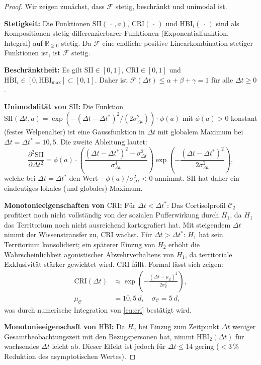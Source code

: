 ﻿\documentclass[12pt, a4paper]{article}
\theoremstyle{plain}
\theoremstyle{definition}
\theoremstyle{remark}
\newcommand{\HBI}{\mathrm{HBI}}
\newcommand{\SII}{\mathrm{SII}}
\newcommand{\CRI}{\mathrm{CRI}}
\newcommand{\R}{\mathbb{R}}
\newcommand{\dt}{\Delta t}
\newcommand{\cort}{\mathcal{C}}
\begin{document}
\begin{proof}
Wir zeigen zunächst, dass $\mathcal{F}$ stetig, beschränkt und unimodal ist.

\textbf{Stetigkeit:} Die Funktionen $\SII(\,\cdot\,, a)$, $\CRI(\,\cdot\,)$
und $\overline{\HBI}_i(\,\cdot\,)$ sind als Kompositionen stetig differenzierbarer
Funktionen (Exponentialfunktion, Integral) auf $\R_{\geq 0}$ stetig. Da
$\mathcal{F}$ eine endliche positive Linearkombination stetiger Funktionen ist,
ist $\mathcal{F}$ stetig.

\textbf{Beschränktheit:} Es gilt $\SII \in [0,1]$, $\CRI \in [0,1]$ und
$\overline{\HBI}_i \in [0, \HBI_{\mathrm{max}}] \subset [0,1]$. Daher ist
$\mathcal{F}(\dt) \leq \alpha + \beta + \gamma = 1$ für alle $\dt \geq 0$.

\textbf{Unimodalität von $\SII$:} Die Funktion $\SII(\dt, a) = \exp(-(\dt -
\dt^*)^2 / (2\sigma_{\dt}^2)) \cdot \phi(a)$ mit $\phi(a) > 0$ konstant (festes
Welpenalter) ist eine Gaussfunktion in $\dt$ mit globalem Maximum bei
$\dt = \dt^* = 10{,}5$. Die zweite Ableitung lautet:
\begin{equation}
  \frac{\partial^2 \SII}{\partial \dt^2} = \phi(a) \cdot \left(\frac{(\dt - \dt^*)^2 - \sigma_{\dt}^2}{\sigma_{\dt}^4}\right)
  \exp\!\left(-\frac{(\dt-\dt^*)^2}{2\sigma_{\dt}^2}\right),
\end{equation}
welche bei $\dt = \dt^*$ den Wert $-\phi(a)/\sigma_{\dt}^2 < 0$ annimmt.
$\SII$ hat daher ein eindeutiges lokales (und globales) Maximum.

\textbf{Monotonieeigenschaften von $\CRI$:}
Für $\dt < \dt^*$: Das Cortisolprofil $\cort_2$ profitiert noch nicht
vollständig von der sozialen Pufferwirkung durch $H_1$, da $H_1$ das Territorium
noch nicht ausreichend kartografiert hat. Mit steigendem $\dt$ nimmt der
Wissenstransfer zu, $\CRI$ wächst. Für $\dt > \dt^*$: $H_1$ hat sein Territorium
konsolidiert; ein späterer Einzug von $H_2$ erhöht die Wahrscheinlichkeit
agonistischer Abwehrverhaltens von $H_1$, da territoriale Exklusivität stärker
gewichtet wird. $\CRI$ fällt. Formal lässt sich zeigen:
\begin{align}
  \CRI(\dt) &\approx \exp\!\left(-\frac{(\dt - \mu_{\cort})^2}{2\sigma_{\cort}^2}\right),\\
  \mu_{\cort} &= 10{,}5\ \si{d},\quad \sigma_{\cort} = 5\ \si{d},
\end{align}
was durch numerische Integration von \cref{eq:cri} bestätigt wird.

\textbf{Monotonieeigenschaft von $\overline{\HBI}$:} Da $H_2$ bei Einzug zum
Zeitpunkt $\dt$ weniger Gesamtbeobachtungszeit mit den Bezugspersonen hat,
nimmt $\overline{\HBI}_2(\dt)$ für wachsendes $\dt$ leicht ab. Dieser Effekt ist
jedoch für $\dt \leq 14$ gering ($<$3\,\% Reduktion des asymptotischen Wertes).


\end{proof}
\end{document}
